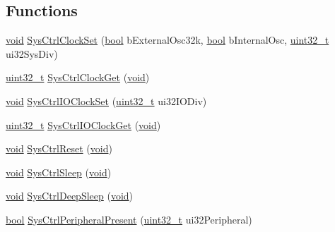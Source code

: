 \subsection*{Functions}
\begin{DoxyCompactItemize}
\item 
\hyperlink{usb__devapi_8h_afabf60e7f57651d6d595a02c75f07cd0}{void} \hyperlink{group__sysctl__api_gacd8d6405b30a393cc4f014929468192d}{Sys\+Ctrl\+Clock\+Set} (\hyperlink{_p_e___types_8h_a97a80ca1602ebf2303258971a2c938e2}{bool} b\+External\+Osc32k, \hyperlink{_p_e___types_8h_a97a80ca1602ebf2303258971a2c938e2}{bool} b\+Internal\+Osc, \hyperlink{_p_e___types_8h_a33594304e786b158f3fb30289278f5af}{uint32\+\_\+t} ui32\+Sys\+Div)
\item 
\hyperlink{_p_e___types_8h_a33594304e786b158f3fb30289278f5af}{uint32\+\_\+t} \hyperlink{group__sysctl__api_ga9ad809b6591f052d72dde7b1fb1f6eed}{Sys\+Ctrl\+Clock\+Get} (\hyperlink{usb__devapi_8h_afabf60e7f57651d6d595a02c75f07cd0}{void})
\item 
\hyperlink{usb__devapi_8h_afabf60e7f57651d6d595a02c75f07cd0}{void} \hyperlink{group__sysctl__api_gafb4b4a106046eece490412f87e5ee715}{Sys\+Ctrl\+I\+O\+Clock\+Set} (\hyperlink{_p_e___types_8h_a33594304e786b158f3fb30289278f5af}{uint32\+\_\+t} ui32\+I\+O\+Div)
\item 
\hyperlink{_p_e___types_8h_a33594304e786b158f3fb30289278f5af}{uint32\+\_\+t} \hyperlink{group__sysctl__api_ga61cdfa03e9a592cfad5ef7ba81595046}{Sys\+Ctrl\+I\+O\+Clock\+Get} (\hyperlink{usb__devapi_8h_afabf60e7f57651d6d595a02c75f07cd0}{void})
\item 
\hyperlink{usb__devapi_8h_afabf60e7f57651d6d595a02c75f07cd0}{void} \hyperlink{group__sysctl__api_ga2935eea51f978e58bd1230074806b3f4}{Sys\+Ctrl\+Reset} (\hyperlink{usb__devapi_8h_afabf60e7f57651d6d595a02c75f07cd0}{void})
\item 
\hyperlink{usb__devapi_8h_afabf60e7f57651d6d595a02c75f07cd0}{void} \hyperlink{group__sysctl__api_ga9c7b12680aece3e39ef4735010da037c}{Sys\+Ctrl\+Sleep} (\hyperlink{usb__devapi_8h_afabf60e7f57651d6d595a02c75f07cd0}{void})
\item 
\hyperlink{usb__devapi_8h_afabf60e7f57651d6d595a02c75f07cd0}{void} \hyperlink{group__sysctl__api_ga46e59afbf63e9e1eb2ae402ab64b3a89}{Sys\+Ctrl\+Deep\+Sleep} (\hyperlink{usb__devapi_8h_afabf60e7f57651d6d595a02c75f07cd0}{void})
\item 
\hyperlink{_p_e___types_8h_a97a80ca1602ebf2303258971a2c938e2}{bool} \hyperlink{group__sysctl__api_ga2fd54c94a7e62b284eb78ad680e59235}{Sys\+Ctrl\+Peripheral\+Present} (\hyperlink{_p_e___types_8h_a33594304e786b158f3fb30289278f5af}{uint32\+\_\+t} ui32\+Peripheral)

\end{DoxyCompactItemize}
